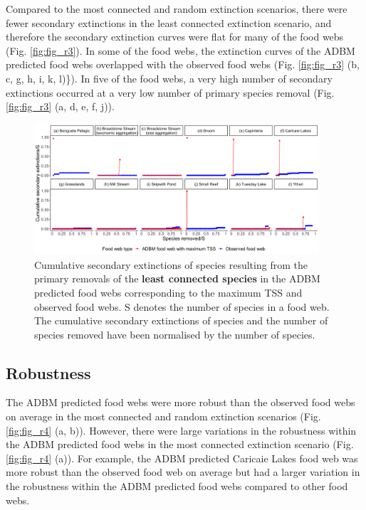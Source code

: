 \documentclass{article}
\begin{document}
Compared to the most connected and random extinction scenarios, there
were fewer secondary extinctions in the least connected extinction
scenario, and therefore the secondary extinction curves were flat for
many of the food webs (Fig. \ref{fig:fig_r3}). In some of the food webs,
the extinction curves of the ADBM predicted food webs overlapped with
the observed food webs (Fig. \ref{fig:fig_r3} (b, c, g, h, i, k, l)\}).
In five of the food webs, a very high number of secondary extinctions
occurred at a very low number of primary species removal (Fig.
\ref{fig:fig_r3} (a, d, e, f, j)).

\begin{figure}

{\centering \includegraphics[width=400px]{../results/plot_leastconnected_maxTSS} 

}

\caption{\label{fig:fig_r3} Cumulative secondary extinctions of species resulting from the primary removals of the \textbf{least connected species} in the ADBM predicted food webs corresponding to the maximum TSS and observed food webs. S denotes the number of species in a food web. The cumulative secondary extinctions of species and the number of species removed have been normalised by the number of species.}\label{fig:unnamed-chunk-4}
\end{figure}

\hypertarget{robustness}{%
\subsection{Robustness}\label{robustness}}

The ADBM predicted food webs were more robust than the observed food
webs on average in the most connected and random extinction scenarios
(Fig. \ref{fig:fig_r4} (a, b)). However, there were large variations in
the robustness within the ADBM predicted food webs in the most connected
extinction scenario (Fig. \ref{fig:fig_r4} (a)). For example, the ADBM
predicted Caricaie Lakes food web was more robust than the observed food
web on average but had a larger variation in the robustness within the
ADBM predicted food webs compared to other food webs.
\end{document}
